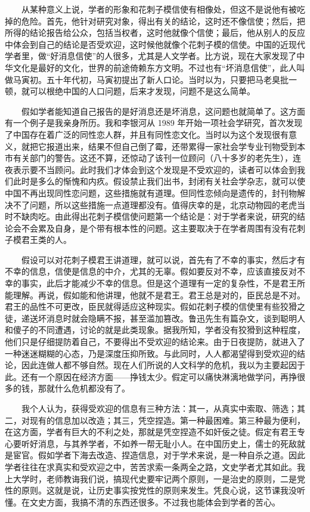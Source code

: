 　　从某种意义上说，学者的形象和花刺子模信使有相像处，但这不是说他有被吃掉的危险。首先，他针对研究对象，得出有关的结论，这时还不像信使；然后，把所得的结论报告给公众，包括当权者，这时他就像个信使；最后，他从别人的反应中体会到自己的结论是否受欢迎，这时候他就像个花刺子模的信使。中国的近现代学者里，做“好消息信使”的人很多，尤其是人文学者。比方说，现在大家发现了中华文化是最好的文化，世界的前途倚赖东方文明。不过也有“坏消息信使”，此人叫做马寅初。五十年代初，马寅初提出了新人口论。当时以为，只要把马老臭批一顿，就可以根绝中国的人口问题，后来才发现，问题不是这么简单。 

　　假如学者能知道自己报告的是好消息还是坏消息，这问题也就简单了。这方面有一个例子是我亲身所历。我和李银河从 1989 年开始一项社会学研究，首次发现了中国存在着广泛的同性恋人群，并且有同性恋文化。当时以为这个发现很有意义，就把它报道出来，结果不但自己倒了霉，还带累得一家社会学专业刊物受到本市有关部门的警告。这还不算，还惊动了该刊一位顾问（八十多岁的老先生），连夜表示要不当顾问。此时我们才体会到这个发现是不受欢迎的，读者可以体会到我们此时是多么的惭愧和内疚。假设禁止我们出书，封闭有关社会学杂志，就可以使中国不再出现同性恋问题，这些措施就有道理。但同性恋倾向是遗传的，封刊物解决不了问题，所以这些措施一点道理都没有。值得庆幸的是，北京动物园的老虎当时不缺肉吃。由此得出花刺子模信使问题第一个结论是：对于学者来说，研究的结论会不会累及自身，是个带有根本性的问题。这主要取决于在学者周围有没有花刺子模君王类的人。 

　　假设可以对花刺子模君王讲道理，就可以说，首先有了不幸的事实，然后才有不幸的信息，信使是信息的中介，尤其的无辜。假如要反对不幸，应该直接反对不幸的事实，此后才能减少不幸的信息。但是这个道理有一定的复杂性，不是君王所能理解。再说，假如能和他讲理，他就不是君王。君王总是对的，臣民总是不对。君王的品性不可更改，臣民就得适应这种现实。假如花剌子模的信使里有些狡猾之徒，递送坏消息时就会隐瞒不报，甚至滥加篡改。鲁迅先生有篇杂文，谈到聪明人和傻子的不同遭遇，讨论的就是此类现象。据我所知，学者没有狡猾到这种程度，他们只是仔细提防着自己，不要得出不受欢迎的结论来。由于日夜提防，就进入了一种迷迷糊糊的心态，乃是深度压抑所致。与此同时，人人都渴望得到受欢迎的结论，因此连做人都不够自然。现在人们所说的人文科学的危机，我以为主要起因于此。还有一个原因在经济方面——挣钱太少。假定可以痛快淋漓地做学问，再挣很多的钱，那就什么危机都没有了。 

　　我个人认为，获得受欢迎的信息有三种方法：其一，从真实中索取、筛选；其二，对现有的信息加以改造；其三，凭空捏造。第一种最困难。第三种最为便利，在这方面，学者有巨大的不利之处，那就是凭空捏造不如奸佞之徒。假定有君王专心要听好消息，与其养学者，不如养一帮无耻小人。在中国历史上，儒士的死敌就是宦官。假如学者下海去改造、捏造信息，对于学术来说，是一种自杀之道。因此学者往往在求真实和受欢迎之中，苦苦求索一条两全之路，文史学者尤其如此。我上大学时，老师教诲我们说，搞现代史要牢记两个原则，一是治史的原则，二是党性的原则。这就是说，让历史事实按党性的原则来发生。凭良心说，这节课我没听懂。在文史方面，我搞不清的东西还很多。不过我也能体会到学者的苦心。 

